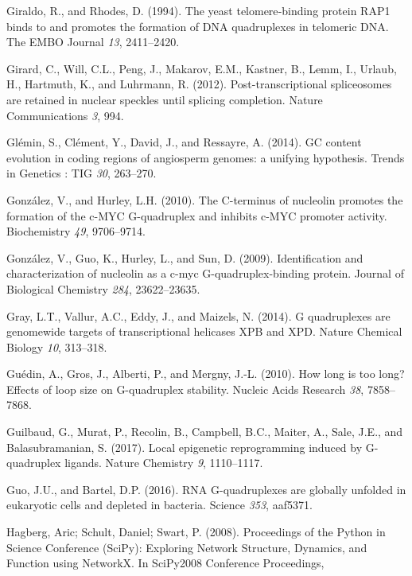 \documentclass[12pt,a4paper,]{report}
\begin{document}
\leavevmode\hypertarget{ref-Giraldo1994}{}%
Giraldo, R., and Rhodes, D. (1994). The yeast telomere‐binding protein
RAP1 binds to and promotes the formation of DNA quadruplexes in
telomeric DNA. The EMBO Journal \emph{13}, 2411--2420.

\leavevmode\hypertarget{ref-Girard2012}{}%
Girard, C., Will, C.L., Peng, J., Makarov, E.M., Kastner, B., Lemm, I.,
Urlaub, H., Hartmuth, K., and Luhrmann, R. (2012). Post-transcriptional
spliceosomes are retained in nuclear speckles until splicing completion.
Nature Communications \emph{3}, 994.

\leavevmode\hypertarget{ref-Glemin2014}{}%
Glémin, S., Clément, Y., David, J., and Ressayre, A. (2014). GC content
evolution in coding regions of angiosperm genomes: a unifying
hypothesis. Trends in Genetics : TIG \emph{30}, 263--270.

\leavevmode\hypertarget{ref-Gonzalez2010}{}%
González, V., and Hurley, L.H. (2010). The C-terminus of nucleolin
promotes the formation of the c-MYC G-quadruplex and inhibits c-MYC
promoter activity. Biochemistry \emph{49}, 9706--9714.

\leavevmode\hypertarget{ref-Gonzalez2009}{}%
González, V., Guo, K., Hurley, L., and Sun, D. (2009). Identification
and characterization of nucleolin as a c-myc G-quadruplex-binding
protein. Journal of Biological Chemistry \emph{284}, 23622--23635.

\leavevmode\hypertarget{ref-Gray2014}{}%
Gray, L.T., Vallur, A.C., Eddy, J., and Maizels, N. (2014). G
quadruplexes are genomewide targets of transcriptional helicases XPB and
XPD. Nature Chemical Biology \emph{10}, 313--318.

\leavevmode\hypertarget{ref-Guedin2010}{}%
Guédin, A., Gros, J., Alberti, P., and Mergny, J.-L. (2010). How long is
too long? Effects of loop size on G-quadruplex stability. Nucleic Acids
Research \emph{38}, 7858--7868.

\leavevmode\hypertarget{ref-Guilbaud2017}{}%
Guilbaud, G., Murat, P., Recolin, B., Campbell, B.C., Maiter, A., Sale,
J.E., and Balasubramanian, S. (2017). Local epigenetic reprogramming
induced by G-quadruplex ligands. Nature Chemistry \emph{9}, 1110--1117.

\leavevmode\hypertarget{ref-Guo2016}{}%
Guo, J.U., and Bartel, D.P. (2016). RNA G-quadruplexes are globally
unfolded in eukaryotic cells and depleted in bacteria. Science
\emph{353}, aaf5371.

\leavevmode\hypertarget{ref-Hagberg2008}{}%
Hagberg, Aric; Schult, Daniel; Swart, P. (2008). Proceedings of the
Python in Science Conference (SciPy): Exploring Network Structure,
Dynamics, and Function using NetworkX. In SciPy2008 Conference
Proceedings,
\end{document}
